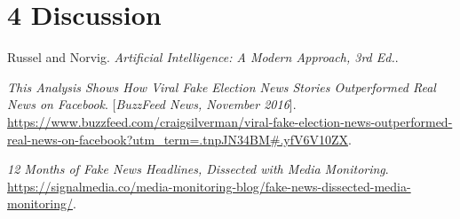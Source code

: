 \documentclass{neu_handout}
\begin{document}
\section*{4 Discussion}


\begin{thebibliography}{9}

Russel and Norvig. 
\textit{Artificial Intelligence: A Modern Approach, 3rd Ed.}. 

 
\textit{This Analysis Shows How Viral Fake Election News Stories Outperformed Real News on Facebook}.
[\textit{BuzzFeed News, November 2016}].
\url{https://www.buzzfeed.com/craigsilverman/viral-fake-election-news-outperformed-real-news-on-facebook?utm_term=.tnpJN34BM#.yfV6V10ZX}.
 

\textit{12 Months of Fake News Headlines, Dissected with Media Monitoring}. 
 \url{https://signalmedia.co/media-monitoring-blog/fake-news-dissected-media-monitoring/}.

\end{thebibliography}
\end{document}
